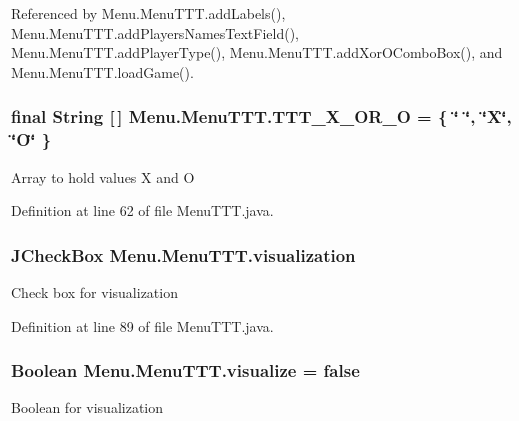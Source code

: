 Referenced by Menu.\+Menu\+T\+T\+T.\+add\+Labels(), Menu.\+Menu\+T\+T\+T.\+add\+Players\+Names\+Text\+Field(), Menu.\+Menu\+T\+T\+T.\+add\+Player\+Type(), Menu.\+Menu\+T\+T\+T.\+add\+Xor\+O\+Combo\+Box(), and Menu.\+Menu\+T\+T\+T.\+load\+Game().

\hypertarget{class_menu_1_1_menu_t_t_t_a05b9b5552eecd3dd9b969a21817f9789}{}
\subsubsection[{T\+T\+T\+\_\+\+X\+\_\+\+O\+R\+\_\+\+O}]{\setlength{\rightskip}{0pt plus 5cm}final String \mbox{[}$\,$\mbox{]} Menu.\+Menu\+T\+T\+T.\+T\+T\+T\+\_\+\+X\+\_\+\+O\+R\+\_\+\+O = \{ \char`\"{} \char`\"{}, \char`\"{}X\char`\"{}, \char`\"{}O\char`\"{} \}\hspace{0.3cm}{\ttfamily [private]}}\label{class_menu_1_1_menu_t_t_t_a05b9b5552eecd3dd9b969a21817f9789}
Array to hold values X and O 

Definition at line 62 of file Menu\+T\+T\+T.\+java.

\hypertarget{class_menu_1_1_menu_t_t_t_a611b82f2267f9ccb007b1ee5744e3088}{}
\subsubsection[{visualization}]{\setlength{\rightskip}{0pt plus 5cm}J\+Check\+Box Menu.\+Menu\+T\+T\+T.\+visualization\hspace{0.3cm}{\ttfamily [private]}}\label{class_menu_1_1_menu_t_t_t_a611b82f2267f9ccb007b1ee5744e3088}
Check box for visualization 

Definition at line 89 of file Menu\+T\+T\+T.\+java.

\hypertarget{class_menu_1_1_menu_t_t_t_a9d69fa1e5f80800c37ee3c47925f3f14}{}
\subsubsection[{visualize}]{\setlength{\rightskip}{0pt plus 5cm}Boolean Menu.\+Menu\+T\+T\+T.\+visualize = false\hspace{0.3cm}{\ttfamily [private]}}\label{class_menu_1_1_menu_t_t_t_a9d69fa1e5f80800c37ee3c47925f3f14}
Boolean for visualization 

